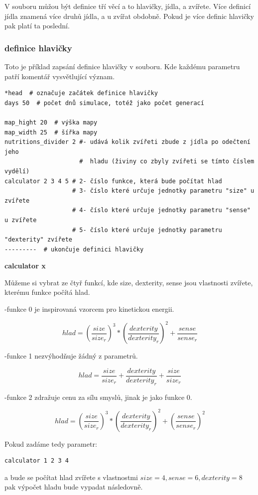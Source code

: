 \documentclass[10pt,a4paper]{article}
\begin{document}
 V souboru můžou být definice tří věcí a to hlavičky, jídla, a zvířete.
 Více definicí jídla znamená více druhů jídla, a u zvířat obdobně.
 Pokud je více definic hlavičky pak platí ta poslední.
 
 
\subsubsection{definice hlavičky}
Toto je příklad zapsání definice hlavičky v souboru. Kde každému parametru patří komentář vysvětlující význam.


\begin{verbatim}
*head  # označuje začátek definice hlavičky
days 50  # počet dnů simulace, totéž jako počet generací 

map_hight 20  # výška mapy 
map_width 25  # šířka mapy 
nutritions_divider 2 #- udává kolik zvířeti zbude z jídla po odečtení jeho                          
                     #  hladu (živiny co zbyly zvířeti se tímto číslem vydělí)
calculator 2 3 4 5 # 2- číslo funkce, která bude počítat hlad 
                   # 3- číslo které určuje jednotky parametru "size" u zvířete 
                   # 4- číslo které určuje jednotky parametru "sense" u zvířete 
                   # 5- číslo které určuje jednotky parametru "dexterity" zvířete 
---------  # ukončuje definici hlavičky

\end{verbatim}

\textbf{calculator x}

Můžeme si vybrat ze čtyř funkcí, kde size, dexterity, sense jsou vlastnosti zvířete, kterému funkce počítá hlad. 


-funkce 0 je inspirovaná vzorcem pro kinetickou energii. 

 $$hlad =(\frac{size}{size_r})^3*(\frac{dexterity}{dexterity_r})^2 +\frac{sense}{sense_r}$$

-funkce 1 nezvýhodňuje žádný z parametrů.

 $$ hlad=\frac{size}{size_r}+ \frac{dexterity}{dexterity_r}+\frac{size}{size_r}$$
 
-funkce 2 zdražuje cenu za sílu smyslů, jinak je jako funkce 0.

 $$hlad =(\frac{size}{size_r})^3*(\frac{dexterity}{dexterity_r})^2 +(\frac{sense}{sense_r})^2$$


Pokud zadáme tedy parametr: \begin{verbatim}calculator 1 2 3 4\end{verbatim} a bude se počítat hlad zvířete s vlastnostmi $size=4,sense=6,dexterity=8$ pak výpočet hladu bude vypadat následovně.
\end{document}

